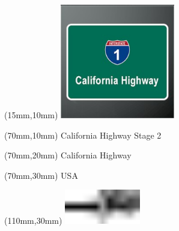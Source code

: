 \null\newpage
\begin{textblock*}{50mm}(15mm,10mm)%
\includegraphics[width=50mm]{LG/2015-05-20_00077.png}
\end{textblock*}
\begin{textblock*}{130mm}(70mm,10mm)%
{\fontsize{20}{20}\selectfont California Highway Stage 2}\\
\end{textblock*}
\begin{textblock*}{120mm}(70mm,20mm)%
{\fontsize{16}{16}\selectfont California Highway}\\
\end{textblock*}
\begin{textblock*}{120mm}(70mm,30mm)%
{\fontsize{12}{12}\selectfont USA}
\end{textblock*}
\begin{textblock*}{30mm}(110mm,30mm)%
\centering
\includegraphics[height=15mm]{icons/tofinish.pdf}
\end{textblock*}
